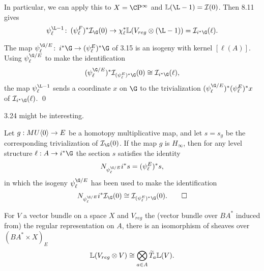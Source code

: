 In particular, we can apply this to $X = \CP^\infty$ and $\ThomSheaf{\L - 1} = \sheaf I(0)$.  Then 8.11 gives \[\psi_\ell^{\L - 1} \co (\psi_\ell^F)^* \sheaf I_{\G}(0) \to \chi_\ell^* \ThomSheaf{V_{reg} \otimes (\L - 1)} = \sheaf I_{i^* \G}(\ell).\]

\begin{theorem}
The map $\psi_\ell^{\G/E} \co i^* \G \to (\psi_\ell^E)^* \G$ of 3.15 is an isogeny with kernel $[\ell(A)]$.  Using $\psi_\ell^{\G/E}$ to make the identification \[(\psi_\ell^{\G/E})^* \sheaf I_{(\psi_\ell^E)^* \G}(0) \cong \sheaf I_{i^* \G}(\ell),\] the map $\psi_\ell^{\L - 1}$ sends a coordinate $x$ on $\G$ to the trivialization $(\psi_\ell^{\G/E})^* (\psi_\ell^E)^* x$ of $\sheaf I_{i^*\G}(\ell)$. \qed
\end{theorem}

3.24 might be interesting.


\begin{theorem} 
Let $g: MU\langle0\rangle \to E$ be a homotopy multiplicative map, and let $s = s_g$ be the corresponding trivialization of $\sheaf I_{\G}(0)$.  If the map $g$ is $H_\infty$, then for any level structure $\ell: A \to i^* \G$ the section $s$ satisfies the identity \[N_{\psi_\ell^{\G/E}} i^* s = (\psi_\ell^E)^* s,\] in which the isogeny $\psi_\ell^{\G/E}$ has been used to make the identification \[N_{\psi_\ell^{\G/E}} i^* \sheaf I_{\G}(0) \cong \sheaf I_{(\psi_\ell^E)^* \G}(0). \qed\]
\end{theorem}

\begin{lemma}
For $V$ a vector bundle on a space $X$ and $V_{reg}$ the (vector bundle over $BA^*$ induced from) the regular representation on $A$, there is an isomorphism of sheaves over $(BA^* \times X)_E$ \[\mathbb{L}(V_{reg} \otimes V) \cong \bigotimes_{a \in A} \widetilde T_a \mathbb{L}(V).\]
\end{lemma}

